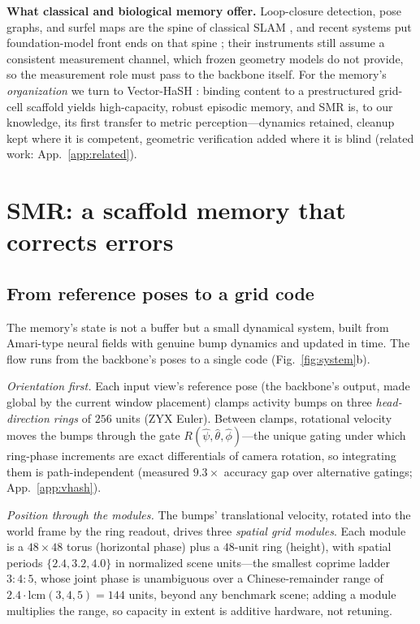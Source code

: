 \documentclass{article}
\newcommand{\smr}{\textsc{SMR}}
\begin{document}
\textbf{What classical and biological memory offer.} Loop-closure
detection, pose graphs, and surfel maps are the spine of classical SLAM
\citep{grisetti,strasdat,elasticfusion}, and recent systems put
foundation-model front ends on that spine
\citep{mast3rslam,vggtslam,vistaslam,slamformer}; their instruments still
assume a consistent measurement channel, which frozen geometry models do not
provide, so the measurement role must pass to the backbone itself. For the
memory's \emph{organization} we turn to Vector-HaSH \citep{vectorhash}:
binding content to a prestructured grid-cell scaffold yields high-capacity,
robust episodic memory, and \smr{} is, to our knowledge, its first transfer
to metric perception---dynamics retained, cleanup kept where it is competent,
geometric verification added where it is blind (related work:
App.~\ref{app:related}).

\section{\smr{}: a scaffold memory that corrects errors}
\label{sec:method}

\subsection{From reference poses to a grid code}
\label{sec:scaffold}
The memory's state is not a buffer but a small dynamical system, built from
Amari-type neural fields with genuine bump dynamics and updated in time. The
flow runs from the backbone's poses to a single code (Fig.~\ref{fig:system}b).

\emph{Orientation first.} Each input view's reference pose (the backbone's
output, made global by the current window placement) clamps activity bumps
on three \emph{head-direction rings} of $256$ units (ZYX Euler). Between
clamps, rotational velocity moves the bumps through the gate
$R(\hat\psi,\hat\theta,\hat\phi)$---the unique gating under which ring-phase
increments are exact differentials of camera rotation, so integrating them
is path-independent (measured $9.3\times$ accuracy gap over alternative
gatings; App.~\ref{app:vhash}).

\emph{Position through the modules.} The bumps' translational velocity,
rotated into the world frame by the ring readout, drives three \emph{spatial
grid modules}. Each module is a $48{\times}48$ torus (horizontal phase) plus
a $48$-unit ring (height), with spatial periods $\{2.4,3.2,4.0\}$ in
normalized scene units---the smallest coprime ladder $3{:}4{:}5$, whose joint
phase is unambiguous over a Chinese-remainder range of
$2.4\cdot\mathrm{lcm}(3,4,5)=144$ units, beyond any benchmark scene; adding a
module multiplies the range, so capacity in extent is additive hardware, not
retuning.
\end{document}
